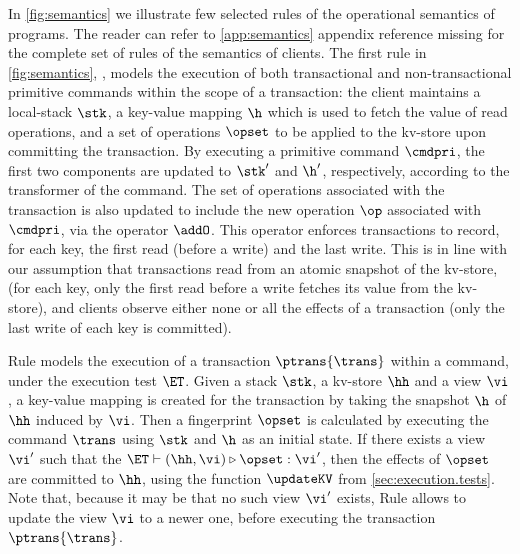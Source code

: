 In \cref{fig:semantics} we illustrate few selected rules of the operational semantics of programs. 
The reader can refer to \cref{app:semantics} {\color{red} appendix reference missing} 
for the complete set of rules of the semantics of clients. 
The first rule in \cref{fig:semantics}, , models the execution of both transactional and 
non-transactional primitive commands within the scope of a transaction: the client maintains 
a local-stack $\stk$, a key-value mapping $\h$ which is used to fetch the value of read operations, 
and a set of operations $\opset$ to be applied to the kv-store upon committing the transaction. 
By executing a primitive command $\cmdpri$,  the first two components are updated to $\stk'$ and 
$\h'$, respectively, according to the transformer of the command. The set of operations associated with 
the transaction is also updated to include the new operation $\op$ associated with $\cmdpri$, 
via the operator $\addO$. This operator enforces transactions to record, for each key, the first 
read (before a write) and the last write. This is in line with our assumption that transactions read from an atomic 
snapshot of the kv-store,
(for each key, only the first read before a write fetches its value from the kv-store), 
and clients observe either none or all the effects of a transaction (only the last write of each key is committed).

Rule  models the execution of a transaction $\ptrans{\trans}$ within a command, under the execution 
test $\ET$. Given a stack $\stk$, a 
kv-store $\hh$ and a view $\vi$, a key-value mapping is created for the transaction by taking the 
snapshot $\h$ of $\hh$ induced by $\vi$. Then a fingerprint $\opset$ is calculated by executing the command $\trans$ using 
$\stk$ and $\h$ as an initial state. If there exists a view $\vi'$ such that the $\ET \vdash (\hh, \vi) \triangleright \opset : \vi'$, 
then the effects of $\opset$ are committed to $\hh$, using the function $\updateKV$ from \cref{sec:execution.tests}. 
Note that, because it may be that no such view $\vi'$ exists, Rule  allows to update the view $\vi$ to a 
newer one, before executing the transaction $\ptrans{\trans}$.

